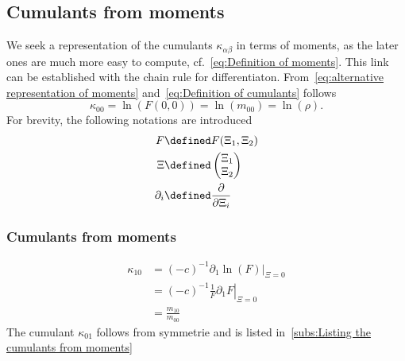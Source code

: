 
\subsection{Cumulants from moments}
\label{sub:Cumulants from moments}

We seek a representation of the cumulants $\kappa_{\alpha\beta}$ in terms of moments, as the later ones are much more easy to compute, cf.~\eqref{eq:Definition of moments}. This link can be established with the chain rule for differentiaton.
From~\eqref{eq:alternative representation of moments} and~\eqref{eq:Definition of cumulants} follows
\begin{equation}
  \kappa_{00} = \ln(F(0,0)) = \ln(m_{00}) = \ln(\rho).
\end{equation}
For brevity, the following notations are introduced
\begin{equation}
  \label{eq:abbreviations for deriving cumulants from moments}
  \begin{aligned}
    F & \defined F(\Xi_1, \Xi_2) \\
    \Xi &\defined \begin{pmatrix}\Xi_1 \\ \Xi_2  \end{pmatrix} \\
    \partial_i &\defined \frac{\partial}{\partial \Xi_i}
  \end{aligned}
\end{equation}

\subsubsection{Cumulants from moments}
\label{subs:Cumulants from moments}

\begin{equation*}
  \begin{aligned}
    \kappa_{10} & = {(-c)}^{-1} \left.\partial_1 \ln(F) \right|_{\Xi = 0} \\
    & = {(-c)}^{-1} \left. \frac{1}{F} \partial_1 F \right|_{\Xi = 0} \\
    & = \frac{m_{10}}{m_{00}}
  \end{aligned}
\end{equation*}
The cumulant $\kappa_{01}$ follows from symmetrie and is listed in~\ref{subs:Listing the cumulants from moments}

